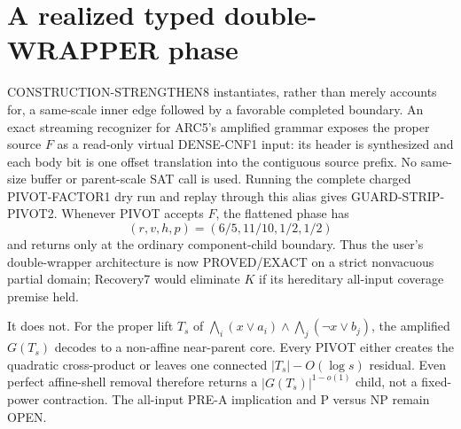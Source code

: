 \section{A realized typed double-WRAPPER phase}
CONSTRUCTION-STRENGTHEN8 instantiates, rather than merely accounts for, a
same-scale inner edge followed by a favorable completed boundary.  An exact
streaming recognizer for ARC5's amplified grammar exposes the proper source
$F$ as a read-only virtual DENSE-CNF1 input: its header is synthesized and
each body bit is one offset translation into the contiguous source prefix.
No same-size buffer or parent-scale SAT call is used.  Running the complete
charged \textsc{PIVOT-FACTOR1} dry run and replay through this alias gives
\textsc{GUARD-STRIP-PIVOT2}.  Whenever PIVOT accepts $F$, the flattened phase
has
\[
 (r,v,h,p)=(6/5,11/10,1/2,1/2)
\]
and returns only at the ordinary component-child boundary.  Thus the user's
double-wrapper architecture is now PROVED/EXACT on a strict nonvacuous
partial domain; Recovery7 would eliminate $K$ if its hereditary all-input
coverage premise held.

It does not.  For the proper lift $T_s$ of
$\bigwedge_i(x\vee a_i)\wedge\bigwedge_j(\neg x\vee b_j)$, the amplified
$G(T_s)$ decodes to a non-affine near-parent core.  Every PIVOT either creates
the quadratic cross-product or leaves one connected $|T_s|-O(\log s)$
residual.  Even perfect affine-shell removal therefore returns a
$|G(T_s)|^{1-o(1)}$ child, not a fixed-power contraction.  The all-input
PRE-A implication and P versus NP remain OPEN.
